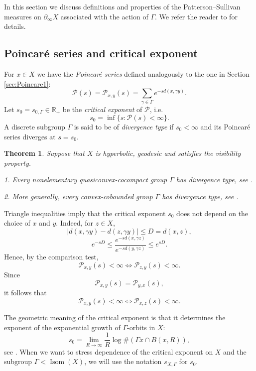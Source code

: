 \documentclass[12pt]{amsbook}%
\newtheorem{thm}{Theorem}[chapter]
\theoremstyle{definition}
\theoremstyle{remark}
\numberwithin{section}{chapter}
\numberwithin{subsection}{section}
\numberwithin{figure}{chapter}
\DeclareMathOperator{\Isom}{Isom}
\def\cP{{\mathscr{P}}}
\def\Ga{\Gamma}
\def\ga{\gamma}
\def\geo{\partial_\infty}
\begin{document}
{{In this section we discuss definitions and properties of the 
Patterson--Sullivan measures on $\geo X$ associated with the action of $\Ga$. We refer the reader to \cite{Coo93, Calegari, BF, DSU} for details. 

\subsection{Poincar\'e series and critical exponent} 


For $x\in X$ we have 
the {\em Poincar\'e series} defined analogously to the one in Section \ref{sec:Poincare1}: \index{Poincar\'e series $\cP(s)$}
\begin{equation}\label{eq:Poincare}
\cP(s) = \cP_{x,y}(s)=\sum_{\gamma \in \Gamma} e^{-s d(x, \gamma y)}.
\end{equation}
Let $s_0=s_{0,\Ga}\in \mathbb R_+$ be the {\em critical exponent}  
of $\cP$, i.e. 
$$
s_0=\inf \{s: \cP(s)<\infty\}. 
$$ 
A discrete subgroup $\Ga$ is said to be of {\em divergence type} if $s_0<\infty$ and its Poincar\'e series diverges at $s=s_0$.  

\begin{thm}
Suppose that $X$ is hyperbolic, geodesic and satisfies the visibility property.  

1. Every nonelementary quasiconvex-cocompact group $\Ga$ has divergence type, see \cite{Coo93}.

2. More generally, every  convex-cobounded group $\Ga$ has divergence type, see \cite[Corollary 17.14]{DSU}.
\end{thm}

Triangle inequalities imply that the critical exponent $s_0$ does not depend on the choice of $x$ and $y$. Indeed, for $z\in X$,
$$
|d(x, \ga y) - d(z, \ga y)|\leqslant D=d(x,z),
$$
$$
e^{-sD}\leqslant \frac{ e^{-s d(x, \ga z)}}{ e^{-s d(y, \ga z)}} \leqslant e^{sD}. 
$$
Hence, by the comparison test, 
$$
\cP_{x,y}(s)<\infty \iff \cP_{z,y}(s)<\infty. 
$$
Since
$$
\cP_{x,y}(s)= \cP_{y,x}(s),
$$
it follows that 
$$
\cP_{x,y}(s)<\infty \iff \cP_{x,z}(s)<\infty. 
$$


The geometric meaning of the critical exponent is that 
it determines the exponent of the exponential growth of $\Ga$-orbits in $X$:
$$
s_0= \lim_{R\to \infty} \frac{1}{R} \log \# (\Ga x \cap B(x,R)), 
$$
see \cite{Coo93}. When we want to stress dependence of the critical exponent on $X$ and the subgroup $\Ga< \Isom(X)$, we will use the notation $s_{X,\Ga}$ for $s_0$. %

}}
\end{document}

